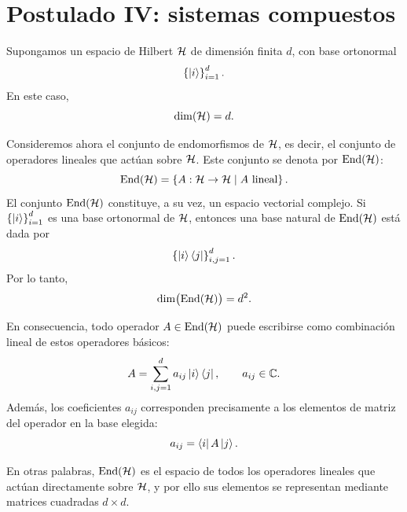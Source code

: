 \documentclass[../main.tex]{subfiles}
\begin{document}
\section{Postulado IV: sistemas compuestos}

Supongamos un espacio de Hilbert $\mathcal{H}$ de dimensión finita $d$, con base ortonormal
\begin{equation*}
    \left\{\ket{i}\right\}_{i=1}^{d}.
\end{equation*}
En este caso,
\begin{equation*}
    \dim(\mathcal{H})=d.
\end{equation*}

Consideremos ahora el conjunto de endomorfismos de $\mathcal{H}$, es decir, el conjunto de operadores lineales que actúan sobre $\mathcal{H}$. Este conjunto se denota por $\operatorname{End}(\mathcal{H})$:
\begin{equation*}
    \operatorname{End}(\mathcal{H})=\left\{A:\mathcal{H}\to\mathcal{H} \mid A \text{ lineal}\right\}.
\end{equation*}
El conjunto $\operatorname{End}(\mathcal{H})$ constituye, a su vez, un espacio vectorial complejo. Si $\left\{\ket{i}\right\}_{i=1}^{d}$ es una base ortonormal de $\mathcal{H}$, entonces una base natural de $\operatorname{End}(\mathcal{H})$ está dada por
\begin{equation*}
    \left\{\ket{i}\bra{j}\right\}_{i,j=1}^{d}.
\end{equation*}
Por lo tanto,
\begin{equation*}
    \dim\bigl(\operatorname{End}(\mathcal{H})\bigr)=d^2.
\end{equation*}

En consecuencia, todo operador $A\in \operatorname{End}(\mathcal{H})$ puede escribirse como combinación lineal de estos operadores básicos:
\begin{equation*}
    A=\sum_{i,j=1}^{d} a_{ij}\ket{i}\bra{j},
    \qquad a_{ij}\in\mathbb{C}.
\end{equation*}
Además, los coeficientes $a_{ij}$ corresponden precisamente a los elementos de matriz del operador en la base elegida:
\begin{equation*}
    a_{ij}=\bra{i}A\ket{j}.
\end{equation*}

En otras palabras, $\operatorname{End}(\mathcal{H})$ es el espacio de todos los operadores lineales que actúan directamente sobre $\mathcal{H}$, y por ello sus elementos se representan mediante matrices cuadradas $d\times d$.
\end{document}
